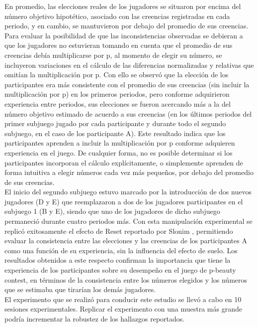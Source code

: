 En promedio, las elecciones reales de los jugadores se situaron por encima del número objetivo hipotético, asociado con las  creencias registradas en cada periodo,  y en cambio, se mantuvieron por debajo del promedio de sus creencias.\\

Para evaluar la posibilidad de que las inconsistencias observadas se debieran a que los jugadores no estuvieran tomando en cuenta que el promedio de sus creencias debía multiplicarse por p, al momento de elegir su número, se incluyeron variaciones en el cálculo de las diferencias normalizadas y relativas que omitían la multiplicación por p. Con ello se observó que la elección de los participantes era más consistente con el promedio de sus creencias (sin incluir la multiplicación por p) en los primeros periodos, pero conforme adquirieron experiencia entre periodos, sus elecciones se fueron acercando más a la del número objetivo estimado de acuerdo a sus creencias (en los últimos periodos del primer subjuego jugado por cada participante y durante todo el segundo subjuego, en el caso de los participante A). Este resultado indica que los participantes aprenden a incluir la multiplicación por p conforme adquieren experiencia en el juego. De cualquier forma, no es posible determinar si los participantes incorporan el cálculo explícitamente, o simplemente aprenden de forma intuitiva a elegir números cada vez más pequeños, por debajo del promedio de sus creencias.\\

El inicio del segundo subjuego estuvo marcado por la introducción de dos nuevos jugadores (D y E) que reemplazaron a dos de los jugadores participantes en el subjuego 1 (B y E), siendo que uno de los jugadores de dicho subjuego permaneció durante cuatro periodos más. Con esta manipulación experimental se replicó exitosamente el efecto de Reset reportado por Slonim \parencite*{Slonim2005}, permitiendo evaluar la consistencia entre las elecciones y las creencias de los participantes A como una función de su experiencia, sin la influencia del efecto de suelo. Los resultados obtenidos a este respecto confirman la importancia que tiene la experiencia de los participantes sobre su desempeño en el juego de p-beauty contest, en términos de la consistencia entre los números elegidos y los números que se estimaba que tirarían los demás jugadores.\\

El experimento que se realizó para conducir este estudio se llevó a cabo en 10 sesiones experimentales. Replicar el experimento con una muestra más grande podría incrementar la robustez de los hallazgos reportados.




